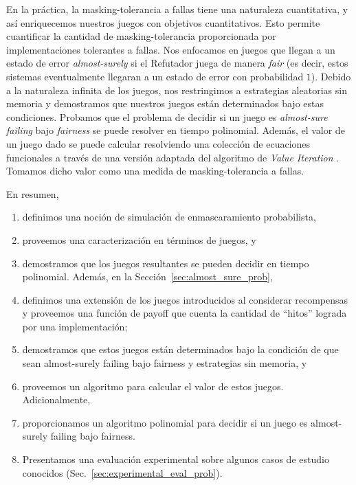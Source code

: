 En la práctica, la masking-tolerancia a fallas tiene una naturaleza cuantitativa, y así enriquecemos nuestros juegos con objetivos cuantitativos. Esto permite cuantificar la
cantidad de masking-tolerancia proporcionada por implementaciones tolerantes a fallas.
%
Nos enfocamos en juegos que llegan a un estado de error \textit{almost-surely} si el Refutador juega
de manera \textit{fair} (es decir, estos sistemas eventualmente llegaran a un estado de error con probabilidad $1$). Debido a la naturaleza infinita de los juegos, nos restringimos a estrategias aleatorias sin memoria y demostramos que nuestros juegos están
determinados bajo estas condiciones.
%
Probamos que el problema de decidir si un juego es \textit{almost-sure failing} bajo \textit{fairness} se puede resolver en tiempo polinomial. Además, el valor de un juego dado se puede calcular
resolviendo una colección de ecuaciones funcionales a través de una versión adaptada del algoritmo de \emph{Value Iteration} \cite{ChatterjeeH08,Condon90,Condon92,KelmendiKKW18}. Tomamos dicho valor como una medida de masking-tolerancia a fallas.

En resumen,
\begin{enumerate}
\item%
  definimos una noción de simulación de enmascaramiento probabilista,
\item%
  proveemos una caracterización en términos de juegos, y
\item%
  demostramos que los juegos resultantes se pueden decidir en tiempo polinomial.
%
Además, en la Sección~\ref{sec:almost_sure_prob},
\item%
  definimos una extensión de los juegos introducidos al considerar recompensas y proveemos una función de payoff que cuenta la cantidad de ``hitos'' lograda por una implementación;
\item%
  demostramos que estos juegos están determinados bajo la condición de que sean almost-surely
  failing bajo fairness y estrategias sin memoria, y
\item%
  proveemos un algoritmo para calcular el valor de estos juegos.
%
Adicionalmente,
\item%
  proporcionamos un algoritmo polinomial para decidir si un juego es almost-surely failing bajo fairness.
%
\item%
  Presentamos una evaluación experimental sobre algunos casos de estudio conocidos (Sec.~\ref{sec:experimental_eval_prob}).
\end{enumerate}
%

